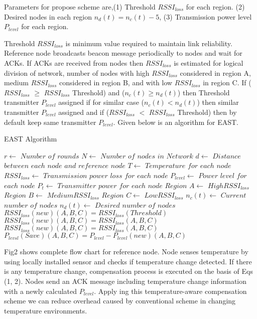 \documentclass[12pt, conference, compsocconf, onecolumn, draftcls]{IEEEtran}
\begin{document}
Parameters for propose scheme are,(1) Threshold $RSSI_{loss}$  for each region. (2) Desired nodes in each region $n_{d}(t)=n_{c}(t)-5$, (3) Transmission power level $P_{level}$ for each region.

Threshold $RSSI_{loss}$ is minimum value required to maintain link reliability. Reference node broadcasts beacon message periodically to nodes and wait for ACKs. If ACKs are received from nodes then $RSSI_{loss}$ is estimated for logical division of network, number of nodes with high $RSSI_{loss}$  considered in region A, medium $RSSI_{loss}$ considered in region B, and with low $RSSI_{loss}$ in region C. If ($RSSI_{loss}$ $\geq$ $RSSI_{loss}$ Threshold) and  ($n_{c}(t)\geq  n_{d}(t)$) then Threshold transmitter $P_{level}$ assigned if  for similar case ($n_{c}(t)<  n_{d}(t)$) then similar transmitter $P_{level}$ assigned and if  ($RSSI_{loss}$ $<$ $RSSI_{loss}$  Threshold) then by default keep same transmitter $P_{level}$. Given below is an algorithm for EAST.
\begin{algorithm}
\caption{EAST Algorithm}
\begin{algorithmic}[1]
\STATE $r \gets$ $Number$ $of$ $rounds$
\STATE $N \gets$ $Number$ $of$ $nodes$ $in$ $Network$
\STATE $d \gets$ $Distance$ $between$ $each$  $node$ $and$ $reference$ $node$
\STATE $T \gets$ $Temperature$ $for$ $each$ $node$
\STATE $RSSI_{loss} \gets$ $Transmission$ $power$ $loss$ $for$ $each$ $node$
\STATE $P_{level} \gets$ $Power$ $level$ $for$ $each$ $node$
\STATE $P_{t} \gets$ $Transmitter$ $power$ $for$ $each$ $node$
\STATE $Region$ $A \gets$  $High RSSI_{loss}$
\STATE $Region$ $B\gets$ $Medium RSSI_{loss}$
\STATE $Region$ $C\gets$ $Low RSSI_{loss}$
\STATE $n_{c}(t) \gets$ $Current$ $number$ $of$ $nodes$
\STATE $n_{d}(t) \gets$ $Desired$ $number$ $of$ $nodes$
\STATE $RSSI_{loss}(new)(A,B,C)=RSSI_{loss}(Threshold)$
\ELSE
\STATE $RSSI_{loss}(new)(A,B,C)=RSSI_{loss}(A,B,C)$
\ENDIF
\ENDIF
{}
\STATE $RSSI_{loss}(new)(A,B,C)=RSSI_{loss}(A,B,C)$
\ENDIF
\STATE $P_{levsl}(Save)(A,B,C) = P_{level}- P_{level}(new)(A,B,C)$
\end{algorithmic}
\end{algorithm}

Fig2 shows complete flow chart for reference node. Node senses temperature by using locally installed sensor and checks if temperature change detected. If there is any temperature change, compensation process is executed on the basis of Eqs (1, 2). Nodes send an ACK message including temperature change information with a newly calculated $P_{level}$. Apply ing this temperature-aware compensation scheme we can reduce overhead caused by conventional scheme in changing temperature environments.
\end{document}
